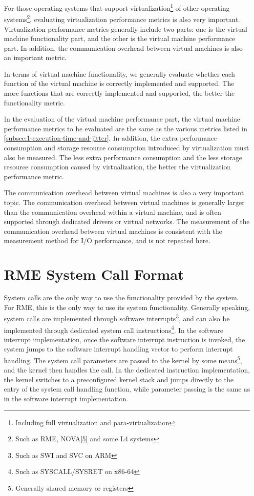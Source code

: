 For those operating systems that support virtualization\footnote{Including full virtualization and para-virtualization} of other operating systems\footnote{Such as RME, NOVA\hyperref[cite:1-5]{{[}5{]}} and some L4 systems}, evaluating virtualization performance metrics is also very important. Virtualization performance metrics generally include two parts: one is the virtual machine functionality part, and the other is the virtual machine performance part. In addition, the communication overhead between virtual machines is also an important metric.

In terms of virtual machine functionality, we generally evaluate whether each function of the virtual machine is correctly implemented and supported. The more functions that are correctly implemented and supported, the better the functionality metric.

In the evaluation of the virtual machine performance part, the virtual machine performance metrics to be evaluated are the same as the various metrics listed in \ref{subsec:1-execution-time-and-jitter}. In addition, the extra performance consumption and storage resource consumption introduced by virtualization must also be measured. The less extra performance consumption and the less storage resource consumption caused by virtualization, the better the virtualization performance metric.

The communication overhead between virtual machines is also a very important topic. The communication overhead between virtual machines is generally larger than the communication overhead within a virtual machine, and is often supported through dedicated drivers or virtual networks. The measurement of the communication overhead between virtual machines is consistent with the measurement method for I/O performance, and is not repeated here.

\section{RME System Call Format}\label{sec:1-system-call-format}

System calls are the only way to use the functionality provided by the system. For RME, this is the only way to use its system functionality. Generally speaking, system calls are implemented through software interrupts\footnote{Such as SWI and SVC on ARM}, and can also be implemented through dedicated system call instructions\footnote{Such as SYSCALL/SYSRET on x86-64}. In the software interrupt implementation, once the software interrupt instruction is invoked, the system jumps to the software interrupt handling vector to perform interrupt handling. The system call parameters are passed to the kernel by some means\footnote{Generally shared memory or registers}, and the kernel then handles the call. In the dedicated instruction implementation, the kernel switches to a preconfigured kernel stack and jumps directly to the entry of the system call handling function, while parameter passing is the same as in the software interrupt implementation.

